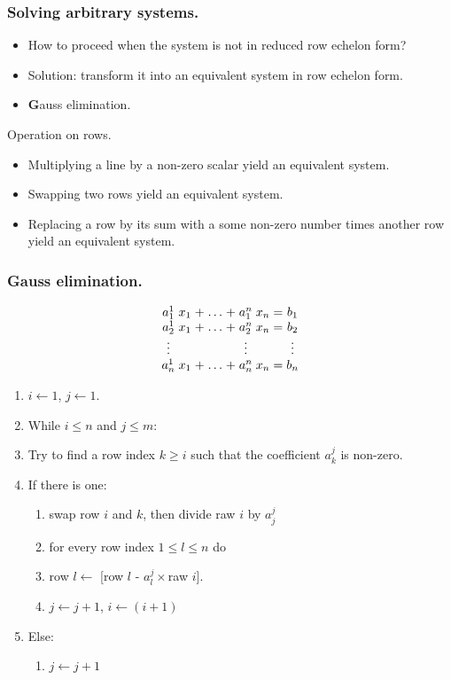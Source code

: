 \documentclass{beamer}
\begin{document}
\begin{frame}
  \frametitle{Solving arbitrary systems.}
  \begin{itemize}
  \item How to proceed when the system is not in reduced row echelon form?
  \item Solution: transform it into an equivalent system in row echelon form.
  \item {\textbf Gauss elimination.}
  \end{itemize}
\end{frame}

\begin{frame}{Operation on rows.}
  \begin{itemize}
  \item Multiplying a line by a non-zero scalar yield an equivalent system.
  \item Swapping two rows yield an equivalent system.
  \item Replacing a row by its sum with a some non-zero number times another row yield an equivalent system. 
  \end{itemize}
\end{frame}

\begin{frame}
  \frametitle{Gauss elimination.}
  \[
  \arraycolsep=1.4pt%
  \begin{array}{ccccccccc}
    a^1_1 & x_1 & + & \dots & + & a^n_1 & x_n & = & b_1 \\
    a^1_2 & x_1 & + & \dots & + & a^n_2 & x_n & = & b_2\\
    \vdots&     &   &      &  &\vdots&     &   & \vdots\\
    a^1_n & x_1 & + & \dots & + &  a^n_n & x_n & = & b_n\\
  \end{array}
  \]
  
  \begin{enumerate}
  \item $i \leftarrow 1$, $j \leftarrow 1$.
  \item While $i \le n$ and $j \le m$:
  \item Try to find a row index $k \ge i$ such that the coefficient $a^j_k$ is non-zero.
  \item If there is one:
    \begin{enumerate}
    \item swap row $i$ and $k$, then divide raw $i$ by $a^{j}_j$
    \item for every row index $1 \le l \le n$ do 
    \item row $l \leftarrow$ [row $l$ - $a^j_l\times$raw $i$].
    \item $j \leftarrow j+1$, $i \leftarrow (i+1)$
    \end{enumerate}
  \item Else:
    \begin{enumerate}
    \item $j \leftarrow j+1$
    \end{enumerate}
  \end{enumerate}
\end{frame}
\end{document}
